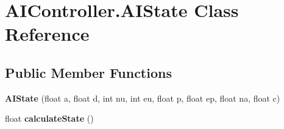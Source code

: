 \hypertarget{class_a_i_controller_1_1_a_i_state}{}\section{A\+I\+Controller.\+A\+I\+State Class Reference}
\label{class_a_i_controller_1_1_a_i_state}
\subsection*{Public Member Functions}
\begin{DoxyCompactItemize}
\item 
\hypertarget{class_a_i_controller_1_1_a_i_state_af8a3df1714218ae8ec1a6e7d2db440a1}{}{\bfseries A\+I\+State} (float a, float d, int nu, int eu, float p, float ep, float na, float c)\label{class_a_i_controller_1_1_a_i_state_af8a3df1714218ae8ec1a6e7d2db440a1}

\item 
\hypertarget{class_a_i_controller_1_1_a_i_state_a674181d9ff21c9ae3cae181b21150ea3}{}float {\bfseries calculate\+State} ()\label{class_a_i_controller_1_1_a_i_state_a674181d9ff21c9ae3cae181b21150ea3}

\end{DoxyCompactItemize}
